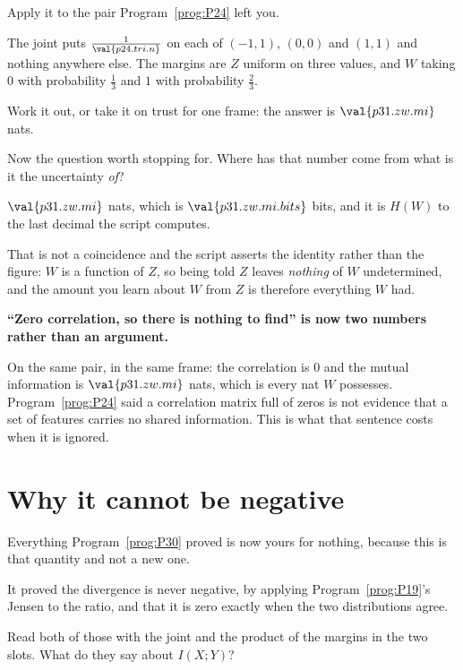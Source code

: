 \begin{fr}
Apply it to the pair Program~\ref{prog:P24} left you.

The joint puts $\frac{1}{\val{p24.tri.n}}$ on each of $(-1, 1)$, $(0, 0)$ and
$(1, 1)$ and nothing anywhere else. The margins are $Z$ uniform on three
values, and $W$ taking $0$ with probability $\frac{1}{3}$ and $1$ with
probability $\frac{2}{3}$.

Work it out, or take it on trust for one frame: the answer is
$\val{p31.zw.mi}$ nats.

Now the question worth stopping for. Where has that number come from
\dash{} what is it the uncertainty \emph{of}?
\dotline
\nextframe
\end{fr}

\begin{fr}

$\val{p31.zw.mi}$ nats, which is $\val{p31.zw.mi.bits}$ bits, and it is
$H(W)$ to the last decimal the script computes.

That is not a coincidence and the script asserts the identity rather than
the figure: $W$ is a function of $Z$, so being told $Z$ leaves \emph{nothing}
of $W$ undetermined, and the amount you learn about $W$ from $Z$ is
therefore everything $W$ had.

\begin{trapbox}
\textbf{\enquote{Zero correlation, so there is nothing to find} is now two
numbers rather than an argument.}

On the same pair, in the same frame: the correlation is $0$ and the mutual
information is $\val{p31.zw.mi}$ nats, which is every nat $W$ possesses.
Program~\ref{prog:P24} said a correlation matrix full of zeros is not
evidence that a set of features carries no shared information. This is what
that sentence costs when it is ignored.
\end{trapbox}

\end{fr}

\section{Why it cannot be negative}
\label{sec:P31-nonneg}

\begin{fr}
Everything Program~\ref{prog:P30} proved is now yours for nothing, because
this is that quantity and not a new one.

It proved the divergence is never negative, by applying
Program~\ref{prog:P19}'s Jensen to the ratio, and that it is zero exactly
when the two distributions agree.

Read both of those with the joint and the product of the margins in the two
slots. What do they say about $I(X; Y)$?
\dotline
\nextframe
\end{fr}

